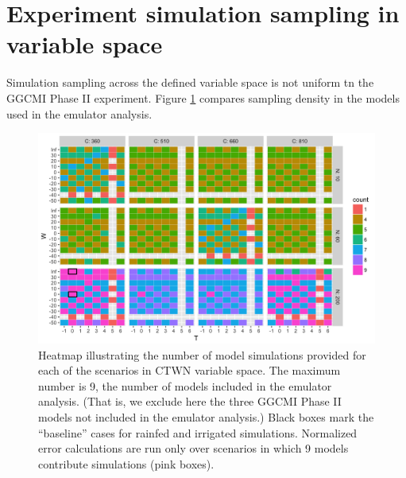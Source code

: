 \documentclass[12pt]{article}
\begin{document}
{\scriptsize \tableofcontents}

\clearpage

\renewcommand{\thefigure}{S\arabic{figure}}

\section{Experiment simulation sampling in variable space}
\begin{flushleft}
	Simulation sampling across the defined variable space is not uniform tn the GGCMI Phase II experiment. Figure \ref{fig:numbersims} compares sampling density in the models used in the emulator analysis. 
\end{flushleft}

\begin{figure}[h!]
  \centering
  \includegraphics[width=\textwidth]{s_how_many_simulations.png}
  \caption{
  Heatmap illustrating the number of model simulations provided for each of the scenarios in CTWN variable space. 
  The maximum number is 9, the number of models included in the emulator analysis. (That is, we exclude here the three GGCMI Phase II models not included in the emulator analysis.) 
  Black boxes mark the ``baseline'' cases for rainfed and irrigated simulations.
	Normalized error calculations are run only over scenarios in which 9 models contribute simulations (pink boxes).
  }
  \label{fig:numbersims}
\end{figure}

\clearpage
\end{document}
